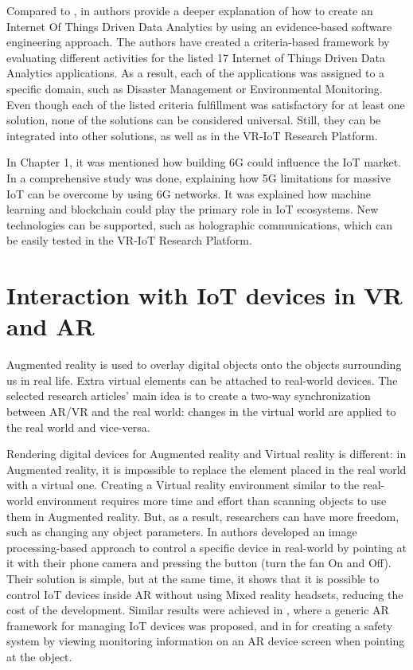 Compared to \cite{k_mohapatra_solution_2016}, in \cite{ahmad_software_2021} authors provide a deeper explanation of how to create an Internet Of Things Driven Data Analytics by using an evidence-based software engineering approach. The authors have created a criteria-based framework by evaluating different activities for the listed 17 Internet of Things Driven Data Analytics applications. As a result, each of the applications was assigned to a specific domain, such as Disaster Management or Environmental Monitoring. Even though each of the listed criteria fulfillment was satisfactory for at least one solution, none of the solutions can be considered universal. Still, they can be integrated into other solutions, as well as in the VR-IoT Research Platform.

In Chapter 1, it was mentioned how building 6G could influence the IoT market. In \cite{guo_enabling_2021} a comprehensive study was done, explaining how 5G limitations for massive IoT can be overcome by using 6G networks. It was explained how machine learning and blockchain could play the primary role in IoT ecosystems. New technologies can be supported, such as holographic communications, which can be easily tested in the VR-IoT Research Platform.

\section{Interaction with IoT devices in VR and AR}

Augmented reality is used to overlay digital objects onto the objects surrounding us in real life. Extra virtual elements can be attached to real-world devices. The selected research articles' main idea is to create a two-way synchronization between AR/VR and the real world: changes in the virtual world are applied to the real world and vice-versa.

Rendering digital devices for Augmented reality and Virtual reality is different: in Augmented reality, it is impossible to replace the element placed in the real world with a virtual one. Creating a Virtual reality environment similar to the real-world environment requires more time and effort than scanning objects to use them in Augmented reality. But, as a result, researchers can have more freedom, such as changing any object parameters. 
In \cite{ankireddy_augmented_2019} authors developed an image processing-based approach to control a specific device in real-world by pointing at it with their phone camera and pressing the button (turn the fan On and Off). Their solution is simple, but at the same time, it shows that it is possible to control IoT devices inside AR without using Mixed reality headsets, reducing the cost of the development. Similar results were achieved in \cite{jo_-situ_2016}, where a generic AR framework for managing IoT devices was proposed, and in \cite{alam_augmented_2017} for creating a safety system by viewing monitoring information on an AR device screen when pointing at the object.

